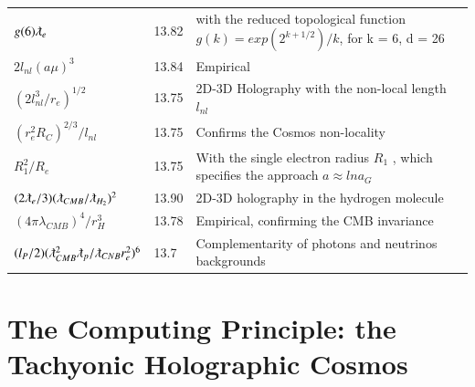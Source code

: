 \documentclass[a4paper,9pt]{article}
\begin{document}
\begin{table}
\begin{tabular}{lll}
 
 
 $ g(6) \lambdabar_{e} $ & 13.82 & with the reduced topological function $g(k) = exp(2^{k+1/2})/k$, for k = 6, d = 26  \\
 
 
 $ 2l_{nl}(a\mu)^3 $ & 13.84 & Empirical \\
 
 
 
 
 
 
 
 
 $ (2l_{nl}^3/r_e)^{1/2}$  & 13.75    & 2D-3D Holography with the non-local length $l_{nl}$ \\
 
  $ (r_e^2R_C)^{2/3}/l_{nl}$  & 13.75    & Confirms the Cosmos non-locality \\
  
  $ R_1^2/R_e$  & 13.75    & With the single electron radius $R_1$ \cite{Sanchez3}, which specifies the approach  $a \approx lna_G$ \cite{Rees}   \\
 
 
 $ (2\lambdabar_{e}/3) (\lambdabar_{CMB}/\lambdabar_{H_2})^2$ & 13.90 &  2D-3D holography in the hydrogen molecule \\
     
   $ (4\pi \lambda_{CMB})^4/r_H^3$ & 13.78 &  Empirical, confirming the CMB invariance \\
   
    $ (l_P/2)(\lambdabar_{CMB}^2\lambdabar_p/\lambdabar_{CNB}r_e^2)^6$  & 13.7    & Complementarity of photons and neutrinos backgrounds \\
   
 
 
 \bottomrule
  \end{tabular}
\end{table} 
 
 
 

\section{The Computing Principle: the Tachyonic Holographic Cosmos}
\end{document}

